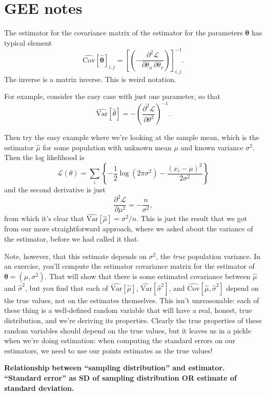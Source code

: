 \documentclass{book}
\begin{document}
\section{GEE notes}\label{gee-notes}

The estimator for the covariance matrix of the estimator for the
parameters \(\bm{\theta}\) has typical element \[
\widehat{\mathrm{Cov}}[\hat{\bm{\theta}}]_{i,j} =
  \left[ \left( -\frac{\partial^2 \mathcal{L}}{\partial \theta_u \, \partial \theta_v} \right) \right]^{-1}_{i,j}.
\] The inverse is a matrix inverse. This is weird notation.

For example, consider the easy case with just one parameter, so that \[
\widehat{\mathrm{Var}}[\hat{\theta}] =
  -\left( \frac{\partial^2 \mathcal{L}}{\partial \theta^2} \right)^{-1}.
\]

Then try the easy example where we're looking at the sample mean, which
is the estimator \(\hat{\mu}\) for some population with unknown mean
\(\mu\) and known variance \(\sigma^2\). Then the log likelihood is \[
\mathcal{L}(\theta) = \sum_i \left\{ -\frac{1}{2} \log (2 \pi \sigma^2) -
  \frac{(x_i - \mu)^2}{2 \sigma^2} \right\}
\] and the second derivative is just \[
\frac{\partial^2 \mathcal{L}}{\partial \mu^2} = -\frac{n}{\sigma^2},
\] from which it's clear that
\(\widehat{\mathrm{Var}}[\hat{\mu}] = \sigma^2/n\). This is just the
result that we got from our more straightforward approach, where we
asked about the variance of the estimator, before we had called it that.

Note, however, that this estimate depends on \(\sigma^2\), the
\emph{true} population variance. In an exercise, you'll compute the
estimator covariance matrix for the estimator of
\(\bm{\theta} = (\mu, \sigma^2)\). That will show that there is some
estimated covariance between \(\hat{\mu}\) and \(\hat{\sigma}^2\), but
you find that each of \(\widehat{\mathrm{Var}}[\hat{\mu}]\),
\(\widehat{\mathrm{Var}}[\hat{\sigma}^2]\), and
\(\widehat{\mathrm{Cov}}[\hat{\mu}, \hat{\sigma}^2]\) depend on the true
values, not on the estimates themselves. This isn't unreasonable: each
of these thing is a well-defined random variable that will have a real,
honest, true distribution, and we're deriving its properties. Clearly
the true properties of these random variables should depend on the true
values, but it leaves us in a pickle when we're doing estimation: when
computing the standard errors on our estimators, we need to use our
points estimates as the true values!

\textbf{Relationship between ``sampling distribution'' and estimator.
``Standard error'' as SD of sampling distribution OR estimate of
standard deviation.}
\end{document}
